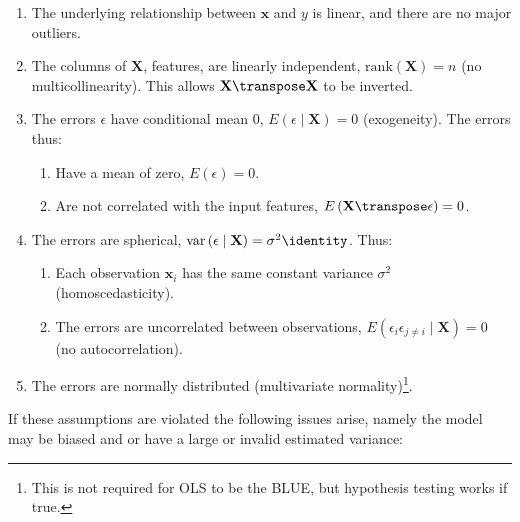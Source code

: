 \begin{enumerate}[noitemsep]
\item The underlying relationship between $\mathbf{x}$ and $y$ is linear, and there are no major outliers.\label{item:regression:linear:linear}
\item The columns of $\mathbf{X}$, \ie features, are linearly independent, \ie $\mathrm{rank}\left(\mathbf{X}\right) = n$ (no multicollinearity). This allows $\mathbf{X}\transpose\mathbf{X}$ to be inverted.\label{item:regression:linear:multicollinearity}
\item The errors $\epsilon$ have conditional mean 0, $E\left(\epsilon \mid \mathbf{X}\right) = 0$ (exogeneity). The errors thus:\label{item:regression:linear:exogeneity}
\begin{enumerate}[noitemsep]
\item Have a mean of zero, $E\left(\epsilon\right) = 0$.
\item Are not correlated with the input features, $E\left(\mathbf{X}\transpose\epsilon\right) = 0$.
\end{enumerate}
\item The errors are spherical, $\mathrm{var}\left(\epsilon \mid \mathbf{X}\right) = \sigma^{2} \identity$. Thus:\label{item:regression:linear:spherical}
\begin{enumerate}[noitemsep]
\item Each observation $\mathbf{x}_{i}$ has the same constant variance $\sigma^{2}$ (homoscedasticity).
\item The errors are uncorrelated between observations, $E\left(\epsilon_{i}\epsilon_{j \neq i} \mid \mathbf{X}\right) = 0$ (no autocorrelation).
\end{enumerate}
\item The errors are normally distributed (multivariate normality)\footnote{This is not required for OLS to be the BLUE, but hypothesis testing works if true.}.\label{item:regression:linear:normality}
\end{enumerate}

If these assumptions are violated the following issues arise,
namely the model may be biased and or have a large or invalid estimated variance:

